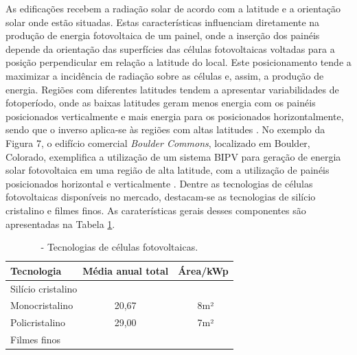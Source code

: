 \begin{onehalfspace}
    \noindent As edificações recebem a radiação solar de acordo com a latitude e a orientação solar onde estão situadas. 
    Estas características influenciam diretamente na produção de energia fotovoltaica de um painel, onde a 
    inserção dos painéis depende da orientação das superfícies das células fotovoltaicas voltadas para a posição 
    perpendicular em relação a latitude do local. Este posicionamento tende a maximizar a incidência de radiação 
    sobre as células e, assim, a produção de energia. Regiões com diferentes latitudes tendem a apresentar 
    variabilidades de fotoperíodo, onde as baixas latitudes geram menos energia com os painéis posicionados 
    verticalmente e mais energia para os posicionados horizontalmente, sendo que o inverso aplica-se às regiões 
    com altas latitudes \cite{Pereira2017}.\vspace{0.3cm} \newline
    No exemplo da Figura 7, o edifício comercial \textit{Boulder Commons}, localizado em Boulder, Colorado, 
    exemplifica a utilização de um sistema BIPV para geração de energia solar fotovoltaica em uma região de 
    alta latitude, com a utilização de painéis posicionados horizontal e verticalmente \cite{AmericanSocietyofHeatingRefrigeratingandAir-ConditioningEngineers-ASHRAE2019,Pereira2017}.
    Dentre as tecnologias de células fotovoltaicas disponíveis no mercado, destacam-se as tecnologias de 
    silício cristalino e filmes finos. As caraterísticas gerais desses componentes são apresentadas na Tabela \ref{tab:tabela1}.
        \begin{table}[ht]\centering
            \caption{\small - Tecnologias de células fotovoltaicas.}
            \vspace*{0.2cm}
            \label{tab:tabela1}
            \begin{tabular}{lcc}
            \hline
            \textbf{Tecnologia}                     & \textbf{Média anual total}    & \textbf{Área/kWp} \\ \hline
            \multicolumn{3}{l||}{Silício cristalino}                                                    \\ \hline
            Monocristalino                          & 20,67                         & ~8m²              \\ \hline
            Policristalino                          & 29,00                         & ~7m²              \\ \hline
            \multicolumn{3}{l||}{Filmes finos}                                                          \\ \hline

\end{tabular}
\end{table}
\end{onehalfspace}
